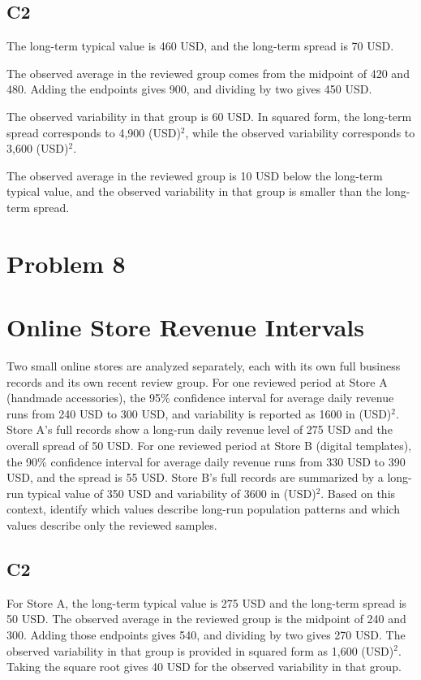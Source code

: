 \begin{ExamProblems}
\subsection*{C2}
		The long-term typical value is 460 USD, and the long-term spread is 70 USD.

		The observed average in the reviewed group comes from the midpoint of 420 and 480.
		Adding the endpoints gives 900, and dividing by two gives 450 USD.

		The observed variability in that group is 60 USD.
		In squared form, the long-term spread corresponds to 4,900 (USD)$^2$, while the observed variability corresponds to 3,600 (USD)$^2$.

		The observed average in the reviewed group is 10 USD below the long-term typical value, and the observed variability in that group is smaller than the long-term spread.


		\newpage
		\item
		\section{Problem 8}
		\section{Online Store Revenue Intervals}
		Two small online stores are analyzed separately, each with its own full business records and its own recent review group.
		For one reviewed period at Store A (handmade accessories), the 95\% confidence interval for average daily revenue runs from 240 USD to 300 USD, and variability is reported as 1600 in (USD)$^2$.
		Store A's full records show a long-run daily revenue level of 275 USD and the overall spread of 50 USD.
		For one reviewed period at Store B (digital templates), the 90\% confidence interval for average daily revenue runs from 330 USD to 390 USD, and the spread is 55 USD.
		Store B's full records are summarized by a long-run typical value of 350 USD and variability of 3600 in (USD)$^2$.
		Based on this context, identify which values describe long-run population patterns and which values describe only the reviewed samples.

\subsection*{C2}
		For Store A, the long-term typical value is 275 USD and the long-term spread is 50 USD.
		The observed average in the reviewed group is the midpoint of 240 and 300.
		Adding those endpoints gives 540, and dividing by two gives 270 USD.
		The observed variability in that group is provided in squared form as 1,600 (USD)$^2$.
		Taking the square root gives 40 USD for the observed variability in that group.


\end{ExamProblems}
